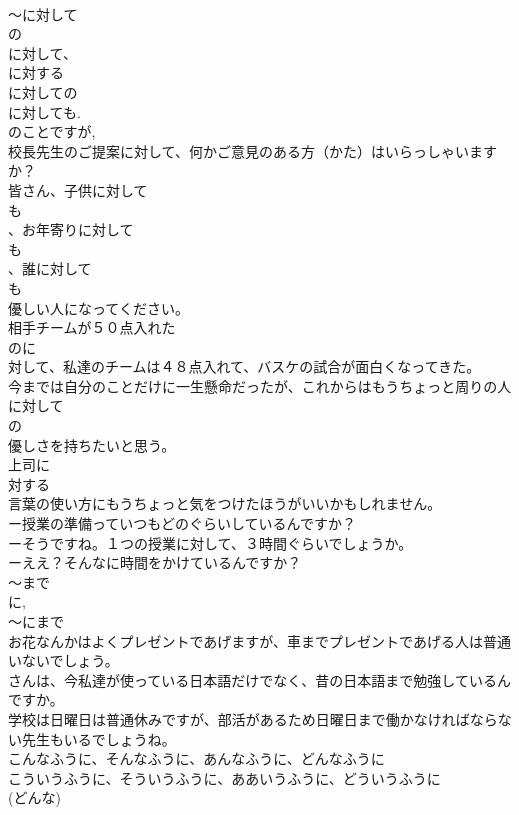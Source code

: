 \documentclass[8pt]{extreport}
\begin{document}
\begin{CJK}{UTF8}{min}
\\	～に対して
\\	の 
\\	に対して、
\\	に対する
\\	に対しての
\\	に対しても.
\\	のことですが, 
\\	校長先生のご提案に対して、何かご意見のある方（かた）はいらっしゃいますか？
\\	皆さん、子供に対して
\\	も
\\	、お年寄りに対して
\\	も
\\	、誰に対して
\\	も
\\	優しい人になってください。
\\	相手チームが５０点入れた
\\	のに
\\	対して、私達のチームは４８点入れて、バスケの試合が面白くなってきた。
\\	今までは自分のことだけに一生懸命だったが、これからはもうちょっと周りの人に対して
\\	の
\\	優しさを持ちたいと思う。
\\	上司に
\\	対する
\\	言葉の使い方にもうちょっと気をつけたほうがいいかもしれません。
\\	ー授業の準備っていつもどのぐらいしているんですか？
\\	ーそうですね。１つの授業に対して、３時間ぐらいでしょうか。
\\	ーええ？そんなに時間をかけているんですか？	
\\	～まで
\\	に, 
\\	～にまで
\\	お花なんかはよくプレゼントであげますが、車までプレゼントであげる人は普通いないでしょう。
\\	さんは、今私達が使っている日本語だけでなく、昔の日本語まで勉強しているんですか。
\\	学校は日曜日は普通休みですが、部活があるため日曜日まで働かなければならない先生もいるでしょうね。
\\	こんなふうに、そんなふうに、あんなふうに、どんなふうに
\\	こういうふうに、そういうふうに、ああいうふうに、どういうふうに
\\	(どんな)

\end{CJK}
\end{document}

